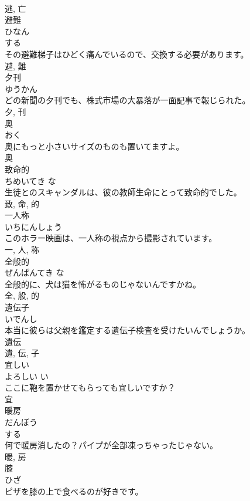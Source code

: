 \documentclass[8pt]{extreport}
\begin{document}
\begin{CJK}{UTF8}{min}
\\	逃, 亡	
\\	避難	
\\	ひなん	
\\	する 
\\	その避難梯子はひどく痛んでいるので、交換する必要があります。	
\\	避, 難	
\\	夕刊	
\\	ゆうかん	
\\	どの新聞の夕刊でも、株式市場の大暴落が一面記事で報じられた。	
\\	夕, 刊	
\\	奥	
\\	おく	
\\	奥にもっと小さいサイズのものも置いてますよ。	
\\	奥	
\\	致命的	
\\	ちめいてき	な 
\\	生徒とのスキャンダルは、彼の教師生命にとって致命的でした。	
\\	致, 命, 的	
\\	一人称	
\\	いちにんしょう	
\\	このホラー映画は、一人称の視点から撮影されています。	
\\	一, 人, 称	
\\	全般的	
\\	ぜんぱんてき	な 
\\	全般的に、犬は猫を怖がるものじゃないんですかね。	
\\	全, 般, 的	
\\	遺伝子	
\\	いでんし	
\\	本当に彼らは父親を鑑定する遺伝子検査を受けたいんでしょうか。	
\\	遺伝 
\\	遺, 伝, 子	
\\	宜しい	
\\	よろしい	い 
\\	ここに鞄を置かせてもらっても宜しいですか？	
\\	宜	
\\	暖房	
\\	だんぼう	
\\	する 
\\	何で暖房消したの？パイプが全部凍っちゃったじゃない。	
\\	暖, 房	
\\	膝	
\\	ひざ	
\\	ピザを膝の上で食べるのが好きです。	

\end{CJK}
\end{document}
